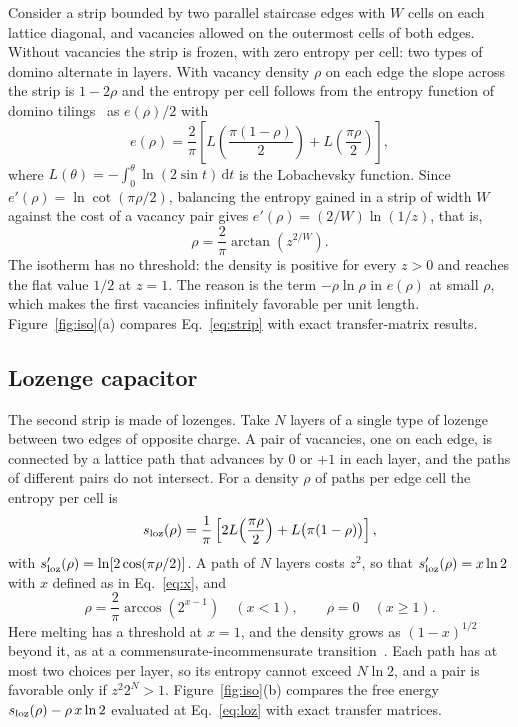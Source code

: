 \documentclass[reprint,aps,pre,superscriptaddress,longbibliography,floatfix,amsmath,amssymb]{revtex4-2}
\newcommand{\dd}{\mathrm{d}}
\begin{document}
Consider a strip bounded by two parallel staircase edges with $W$ cells on each lattice diagonal, and vacancies allowed on the outermost cells of both edges. Without vacancies the strip is frozen, with zero entropy per cell: two types of domino alternate in layers. With vacancy density $\rho$ on each edge the slope across the strip is $1-2\rho$ and the entropy per cell follows from the entropy function of domino tilings~\cite{cohn2001} as $e(\rho)/2$ with
\begin{equation}
  e(\rho)=\frac{2}{\pi}\left[L\!\left(\frac{\pi(1-\rho)}{2}\right)+L\!\left(\frac{\pi\rho}{2}\right)\right],
\end{equation}
where $L(\theta)=-\int_0^\theta\ln(2\sin t)\,\dd t$ is the Lobachevsky function. Since $e'(\rho)=\ln\cot(\pi\rho/2)$, balancing the entropy gained in a strip of width $W$ against the cost of a vacancy pair gives $e'(\rho)=(2/W)\ln(1/z)$, that is,
\begin{equation}\label{eq:strip}
  \rho=\frac{2}{\pi}\arctan\!\left(z^{2/W}\right).
\end{equation}
The isotherm has no threshold: the density is positive for every $z>0$ and reaches the flat value $1/2$ at $z=1$. The reason is the term $-\rho\ln\rho$ in $e(\rho)$ at small $\rho$, which makes the first vacancies infinitely favorable per unit length. Figure~\ref{fig:iso}(a) compares Eq.~\eqref{eq:strip} with exact transfer-matrix results.

\subsection{Lozenge capacitor}

The second strip is made of lozenges. Take $N$ layers of a single type of lozenge between two edges of opposite charge. A pair of vacancies, one on each edge, is connected by a lattice path that advances by $0$ or $+1$ in each layer, and the paths of different pairs do not intersect. For a density $\rho$ of paths per edge cell the entropy per cell is
\begin{equation}
  s_{\rm loz}(\rho)=\frac{1}{\pi}\left[2L\!\left(\frac{\pi\rho}{2}\right)+L\bigl(\pi(1-\rho)\bigr)\right],
\end{equation}
with $s_{\rm loz}'(\rho)=\ln[2\cos(\pi\rho/2)]$. A path of $N$ layers costs $z^2$, so that $s_{\rm loz}'(\rho)=x\ln 2$ with $x$ defined as in Eq.~\eqref{eq:x}, and
\begin{equation}\label{eq:loz}
  \rho=\frac{2}{\pi}\arccos\!\left(2^{x-1}\right)\quad(x<1),\qquad \rho=0\quad(x\ge1).
\end{equation}
Here melting has a threshold at $x=1$, and the density grows as $(1-x)^{1/2}$ beyond it, as at a commensurate-incommensurate transition~\cite{TODO-pokrovsky1979}. Each path has at most two choices per layer, so its entropy cannot exceed $N\ln 2$, and a pair is favorable only if $z^2 2^N>1$. Figure~\ref{fig:iso}(b) compares the free energy $s_{\rm loz}(\rho)-\rho\,x\ln2$ evaluated at Eq.~\eqref{eq:loz} with exact transfer matrices.
\end{document}
